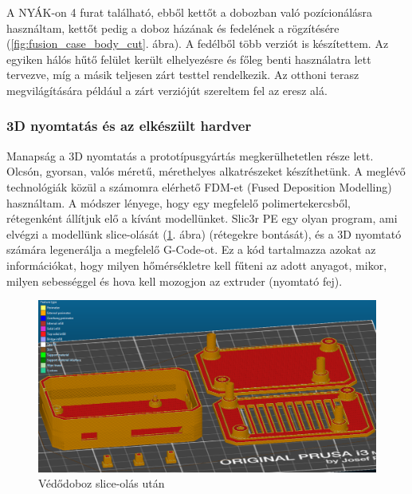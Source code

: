 \documentclass[../main.tex]{subfiles}
\begin{document}
            A NYÁK-on 4 furat található, ebből kettőt a dobozban való pozícionálásra használtam, kettőt pedig a doboz házának és fedelének a rögzítésére (\ref{fig:fusion_case_body_cut}. ábra).  A fedélből több verziót is készítettem. Az egyiken hálós hűtő felület került elhelyezésre és főleg benti használatra lett tervezve, míg a másik teljesen zárt testtel rendelkezik. Az otthoni terasz megvilágítására például a zárt verziójút szereltem fel az eresz alá. 
            
        
        \subsubsection{3D nyomtatás és az elkészült hardver}
            Manapság a 3D nyomtatás a prototípusgyártás megkerülhetetlen része lett. Olcsón, gyorsan, valós méretű, mérethelyes alkatrészeket készíthetünk. A meglévő technológiák közül a számomra elérhető FDM-et (Fused Deposition Modelling) használtam. A módszer lényege, hogy egy megfelelő polimertekercsből, rétegenként állítjuk elő a kívánt modellünket. Slic3r PE egy olyan program, ami elvégzi a modellünk slice-olását (\ref{fig:ledstrip_case_slice}. ábra) (rétegekre bontását), és a 3D nyomtató számára legenerálja a megfelelő G-Code-ot. Ez a kód tartalmazza azokat az információkat, hogy milyen hőmérsékletre kell fűteni az adott anyagot, mikor, milyen sebességgel és hova kell mozogjon az extruder (nyomtató fej). 
            
            \begin{figure}[h!]
                \centering
                    \includegraphics[width=13cm]{resources/pcb_res/slic3r_ledstrip_case.png}
                    \caption{Védődoboz slice-olás után}
                    \label{fig:ledstrip_case_slice}
            \end{figure} 
            
\end{document}
